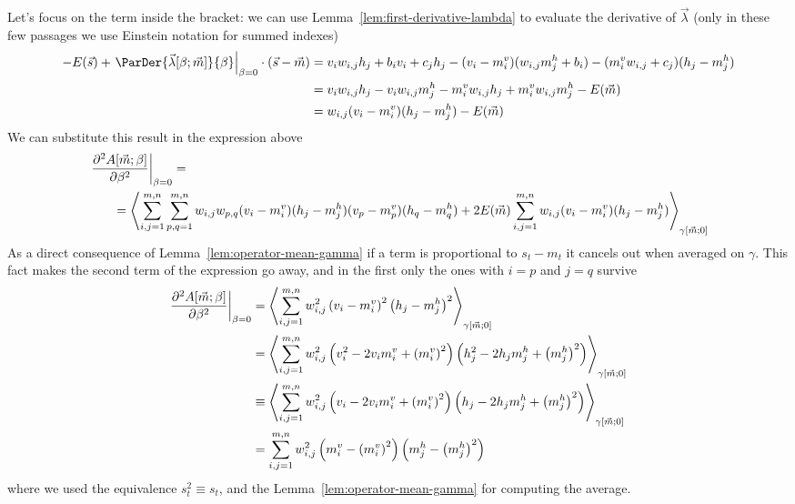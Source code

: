 Let's focus on the term inside the bracket: we can use Lemma~\ref{lem:first-derivative-lambda}
to evaluate the derivative of \(\vec{\lambda}\) (only in these few passages we use Einstein notation
for summed indexes)
\begin{align*}
  -E{(\vec{s})} + \left.\ParDer{\Lambd{\beta}{\vec{m}}}{\beta}\right|_{\beta=0}\cdot(\vec{s}-\vec{m})
  &= v_iw_{i,j}h_j +b_iv_i+c_jh_j - (v_i-\mvi)(w_{i,j}\mhj +b_i) - (\mvi w_{i,j}+c_j)(h_j-\mhj) \\
  &= v_iw_{i,j}h_j - v_i w_{i,j} \mhj - \mvi w_{i,j} h_j + \mvi w_{i,j} \mhj - E{(\vec{m})}\\
  &= w_{i,j} (v_i-\mvi)(h_j-\mhj) - E{(\vec{m})}
\end{align*}
We can substitute this result in the expression above
\begin{align*}
  &\left.\frac{\partial^2A{\left[\vec{m};\beta\right]}}{\partial\beta^2}\right|_{\beta=0}=\\
  &\qquad= \left\langle
      \sum_{i,j=1}^{m,n}\sum_{p,q=1}^{m,n} w_{i,j} w_{p,q}(v_i-m_i^v)(h_j-m_j^h)(v_p-m_p^v)(h_q-m_q^h)
      +2E{(\vec{m})}\sum_{i,j=1}^{m,n}w_{i,j}(v_i-m_i^v)(h_j-m_j^h)
    \right\rangle_{\gamma{\left[\vec{m};0\right]}}
\end{align*}
As a direct consequence of Lemma~\ref{lem:operator-mean-gamma} if a term is proportional to \(s_t-m_t\)
it cancels out when averaged on \(\gamma\). This fact makes the second term of the expression go away,
and in the first only the ones with \(i=p\) and \(j=q\) survive
\begin{align*}
  \left.\frac{\partial^2A{\left[\vec{m};\beta\right]}}{\partial\beta^2}\right|_{\beta=0}
    &=\left\langle\sum_{i,j=1}^{m,n} w_{i,j}^2\left(v_i-m_i^v\right)^2\left(h_j-m_j^h\right)^2\right\rangle_{\gamma{\left[\vec{m};0\right]}} \\
    &=\left\langle\sum_{i,j=1}^{m,n} w_{i,j}^2\left(v_i^2 -2v_im_i^v+{\left(m_i^v\right)}^2\right)\left(h_j^2-2h_jm_j^h +{\left(m_j^h\right)}^2\right)\right\rangle_{\gamma{\left[\vec{m};0\right]}}\\
    &\equiv\left\langle\sum_{i,j=1}^{m,n} w_{i,j}^2\left(v_i-2v_im_i^v+{\left(m_i^v\right)}^2\right)\left(h_j-2h_jm_j^h +{\left(m_j^h\right)}^2\right)\right\rangle_{\gamma{\left[\vec{m};0\right]}}\\
    &=\sum_{i,j=1}^{m,n} w_{i,j}^2\left(m_i^v-{\left(m_i^v\right)}^2\right)\left(m_j^h-{\left(m_j^h\right)}^2\right)
\end{align*}
where we used the equivalence \(s_t^2 \equiv s_t\), and the Lemma~\ref{lem:operator-mean-gamma}
for computing the average.

